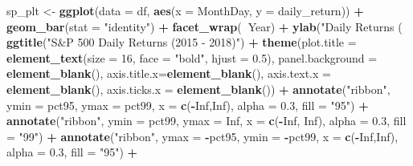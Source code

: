 \documentclass[]{book}
\newenvironment{Shaded}{\begin{snugshade}}{\end{snugshade}}
\newcommand{\DataTypeTok}[1]{\textcolor[rgb]{0.13,0.29,0.53}{#1}}
\newcommand{\DecValTok}[1]{\textcolor[rgb]{0.00,0.00,0.81}{#1}}
\newcommand{\FloatTok}[1]{\textcolor[rgb]{0.00,0.00,0.81}{#1}}
\newcommand{\KeywordTok}[1]{\textcolor[rgb]{0.13,0.29,0.53}{\textbf{#1}}}
\newcommand{\NormalTok}[1]{#1}
\newcommand{\OperatorTok}[1]{\textcolor[rgb]{0.81,0.36,0.00}{\textbf{#1}}}
\newcommand{\OtherTok}[1]{\textcolor[rgb]{0.56,0.35,0.01}{#1}}
\newcommand{\StringTok}[1]{\textcolor[rgb]{0.31,0.60,0.02}{#1}}
\begin{document}
\begin{Shaded}
\begin{Highlighting}[]
\NormalTok{sp_plt <-}\StringTok{ }\KeywordTok{ggplot}\NormalTok{(}\DataTypeTok{data =}\NormalTok{ df, }\KeywordTok{aes}\NormalTok{(}\DataTypeTok{x =}\NormalTok{ MonthDay, }\DataTypeTok{y =}\NormalTok{ daily_return)) }\OperatorTok{+}
\StringTok{  }\KeywordTok{geom_bar}\NormalTok{(}\DataTypeTok{stat =} \StringTok{"identity"}\NormalTok{) }\OperatorTok{+}
\StringTok{  }\KeywordTok{facet_wrap}\NormalTok{(}\OperatorTok{~}\NormalTok{Year) }\OperatorTok{+}\StringTok{ }
\StringTok{  }\KeywordTok{ylab}\NormalTok{(}\StringTok{"Daily Returns (% of Prev Close)"}\NormalTok{) }\OperatorTok{+}
\StringTok{  }\KeywordTok{ggtitle}\NormalTok{(}\StringTok{"S&P 500 Daily Returns (2015 - 2018)"}\NormalTok{) }\OperatorTok{+}\StringTok{ }
\StringTok{  }\KeywordTok{theme}\NormalTok{(}\DataTypeTok{plot.title =} \KeywordTok{element_text}\NormalTok{(}\DataTypeTok{size =} \DecValTok{16}\NormalTok{, }\DataTypeTok{face =} \StringTok{"bold"}\NormalTok{, }\DataTypeTok{hjust =} \FloatTok{0.5}\NormalTok{), }
        \DataTypeTok{panel.background =} \KeywordTok{element_blank}\NormalTok{(), }\DataTypeTok{axis.title.x=}\KeywordTok{element_blank}\NormalTok{(), }
        \DataTypeTok{axis.text.x =}  \KeywordTok{element_blank}\NormalTok{(), }\DataTypeTok{axis.ticks.x =} \KeywordTok{element_blank}\NormalTok{()) }\OperatorTok{+}\StringTok{ }
\StringTok{  }\KeywordTok{annotate}\NormalTok{(}\StringTok{"ribbon"}\NormalTok{, }\DataTypeTok{ymin =}\NormalTok{ pct95, }\DataTypeTok{ymax =}\NormalTok{ pct99, }\DataTypeTok{x =} \KeywordTok{c}\NormalTok{(}\OperatorTok{-}\OtherTok{Inf}\NormalTok{,}\OtherTok{Inf}\NormalTok{), }\DataTypeTok{alpha =} \FloatTok{0.3}\NormalTok{, }\DataTypeTok{fill =} \StringTok{"95"}\NormalTok{) }\OperatorTok{+}
\StringTok{  }\KeywordTok{annotate}\NormalTok{(}\StringTok{"ribbon"}\NormalTok{, }\DataTypeTok{ymin =}\NormalTok{ pct99, }\DataTypeTok{ymax =} \OtherTok{Inf}\NormalTok{, }\DataTypeTok{x =} \KeywordTok{c}\NormalTok{(}\OperatorTok{-}\OtherTok{Inf}\NormalTok{, }\OtherTok{Inf}\NormalTok{), }\DataTypeTok{alpha =} \FloatTok{0.3}\NormalTok{, }\DataTypeTok{fill =} \StringTok{"99"}\NormalTok{) }\OperatorTok{+}\StringTok{ }
\StringTok{  }\KeywordTok{annotate}\NormalTok{(}\StringTok{"ribbon"}\NormalTok{, }\DataTypeTok{ymax =} \OperatorTok{-}\NormalTok{pct95, }\DataTypeTok{ymin =} \OperatorTok{-}\NormalTok{pct99, }\DataTypeTok{x =} \KeywordTok{c}\NormalTok{(}\OperatorTok{-}\OtherTok{Inf}\NormalTok{,}\OtherTok{Inf}\NormalTok{), }\DataTypeTok{alpha =} \FloatTok{0.3}\NormalTok{, }\DataTypeTok{fill =} \StringTok{"95"}\NormalTok{) }\OperatorTok{+}\StringTok{ }
}
\end{Highlighting}
\end{Shaded}
\end{document}

